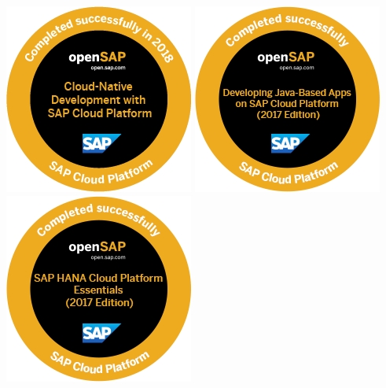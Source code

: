 \begin{cventries}
{\begin{center}
	\hspace{0.1cm}
	\href{https://open.sap.com/verify/xosen-nykel-vybup-susig-sihim}{\includegraphics[scale=0.40]{badges/cp5_open_badge}}          
	\hspace{0.1cm}
	\href{https://open.sap.com/verify/xuhes-rimus-bikon-roper-hicom}{\includegraphics[scale=0.40]{badges/hcp2-1_open_badge}}                 
	\hspace{0.1cm}
	\href{https://open.sap.com/verify/xulor-nynoz-soped-muvuv-zitek}
{\includegraphics[scale=0.40]{badges/hcp1-1_open_badge}} 
    \end{center}   
    }
    \vspace{-0.1cm}


\end{cventries}
